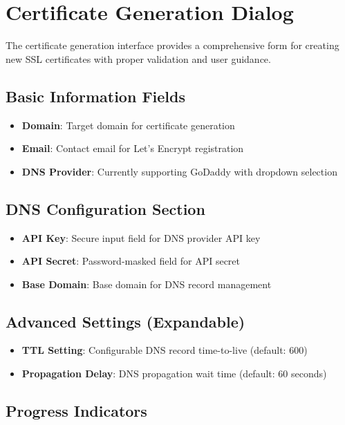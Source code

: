 \section{Certificate Generation Dialog}

The certificate generation interface provides a comprehensive form for creating new SSL certificates with proper validation and user guidance.

\subsection{Basic Information Fields}

\begin{itemize}
    \item \textbf{Domain}: Target domain for certificate generation
    \item \textbf{Email}: Contact email for Let's Encrypt registration
    \item \textbf{DNS Provider}: Currently supporting GoDaddy with dropdown selection
\end{itemize}

\subsection{DNS Configuration Section}

\begin{itemize}
    \item \textbf{API Key}: Secure input field for DNS provider API key
    \item \textbf{API Secret}: Password-masked field for API secret
    \item \textbf{Base Domain}: Base domain for DNS record management
\end{itemize}

\subsection{Advanced Settings (Expandable)}

\begin{itemize}
    \item \textbf{TTL Setting}: Configurable DNS record time-to-live (default: 600)
    \item \textbf{Propagation Delay}: DNS propagation wait time (default: 60 seconds)
\end{itemize}

\subsection{Progress Indicators}

